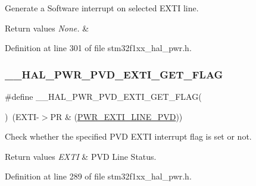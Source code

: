 Generate a Software interrupt on selected E\+X\+TI line. 


\begin{DoxyRetVals}{Return values}
{\em None.} & \\
\hline
\end{DoxyRetVals}


Definition at line 301 of file stm32f1xx\+\_\+hal\+\_\+pwr.\+h.

\mbox{\label{group___p_w_r___exported___macros_ga5e66fa75359b51066e0731ac1e5ae438}} 
\subsubsection{\texorpdfstring{\+\_\+\+\_\+\+H\+A\+L\+\_\+\+P\+W\+R\+\_\+\+P\+V\+D\+\_\+\+E\+X\+T\+I\+\_\+\+G\+E\+T\+\_\+\+F\+L\+AG}{\_\_HAL\_PWR\_PVD\_EXTI\_GET\_FLAG}}
{\footnotesize\ttfamily \#define \+\_\+\+\_\+\+H\+A\+L\+\_\+\+P\+W\+R\+\_\+\+P\+V\+D\+\_\+\+E\+X\+T\+I\+\_\+\+G\+E\+T\+\_\+\+F\+L\+AG(\begin{DoxyParamCaption}{ }\end{DoxyParamCaption})~(E\+X\+TI-\/$>$PR \& (\hyperlink{group___p_w_r___private___constants_ga43a49255649e03d2d2b6b12c5c379d2b}{P\+W\+R\+\_\+\+E\+X\+T\+I\+\_\+\+L\+I\+N\+E\+\_\+\+P\+VD}))}



Check whether the specified P\+VD E\+X\+TI interrupt flag is set or not. 


\begin{DoxyRetVals}{Return values}
{\em E\+X\+TI} & P\+VD Line Status. \\
\hline
\end{DoxyRetVals}


Definition at line 289 of file stm32f1xx\+\_\+hal\+\_\+pwr.\+h.

